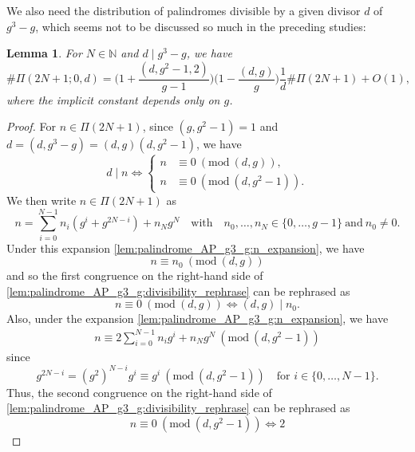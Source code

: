 \documentclass{amsart}
\theoremstyle{plain}
\newtheorem{lemma}[theorem]{Lemma}
\theoremstyle{definition}
\renewcommand{\mod}[1]{(\mathrm{mod}\ #1)}
\begin{document}
We also need the distribution of palindromes
divisible by a given divisor $d$ of $g^{3}-g$,
which seems not to be discussed so much in the preceding studies:
\begin{lemma}
\label{lem:palindrome_AP_g3_g}
For $N\in\mathbb{N}$ and $d\mid g^{3}-g$, we have
\[
\#\Pi(2N+1;0,d)
=
\biggl(1+\frac{(d,g^{2}-1,2)}{g-1}\biggr)
\biggl(1-\frac{(d,g)}{g}\biggr)
\frac{1}{d}\#\Pi(2N+1)
+O(1),
\]
where the implicit constant depends only on $g$.
\end{lemma}
\begin{proof}
For $n\in\Pi(2N+1)$, since $(g,g^{2}-1)=1$ and $d=(d,g^{3}-g)=(d,g)(d,g^{2}-1)$, we have
\begin{equation}
\label{lem:palindrome_AP_g3_g:divisibility_rephrase}
d\mid n
\iff
\left\{
\begin{aligned}
n&\equiv0\ \mod{(d,g)},\\
n&\equiv0\ \mod{(d,g^{2}-1)}.
\end{aligned}
\right.
\end{equation}
We then write $n\in\Pi(2N+1)$ as
\begin{equation}
\label{lem:palindrome_AP_g3_g:n_expansion}
n
=
\sum_{i=0}^{N-1}
n_{i}(g^{i}+g^{2N-i})
+
n_{N}g^{N}
\quad\text{with}\quad
n_{0},\ldots,n_{N}\in\{0,\ldots,g-1\}
\ \text{and}\ 
n_{0}\neq0.
\end{equation}
Under this expansion \cref{lem:palindrome_AP_g3_g:n_expansion}, we have
\[
n
\equiv
n_{0}
\ \mod{(d,g)}
\]
and so the first congruence on the right-hand side of \cref{lem:palindrome_AP_g3_g:divisibility_rephrase}
can be rephrased as
\begin{equation}
\label{lem:palindrome_AP_g3_g:d_g_cond_rephrased}
n\equiv0\ \mod{(d,g)}
\iff
(d,g)\mid n_{0}.
\end{equation}
Also, under the expansion \cref{lem:palindrome_AP_g3_g:n_expansion}, we have
\begin{align}
n
\equiv
2
\sum_{i=0}^{N-1}
n_{i}g^{i}
+
n_{N}g^{N}\ \mod{(d,g^{2}-1)}
\end{align}
since
\[
g^{2N-i}
=
(g^{2})^{N-i}g^{i}
\equiv
g^{i}\ \mod{(d,g^{2}-1)}
\quad\text{for $i\in\{0,\ldots,N-1\}$}.
\]
Thus, the second congruence on the right-hand side of \cref{lem:palindrome_AP_g3_g:divisibility_rephrase}
can be rephrased as
\begin{equation}
\label{lem:palindrome_AP_g3_g:d_g2_1_cond_rephrased_pre}
n\equiv0\ \mod{(d,g^{2}-1)}
\iff
2

\end{equation}
\end{proof}
\end{document}
